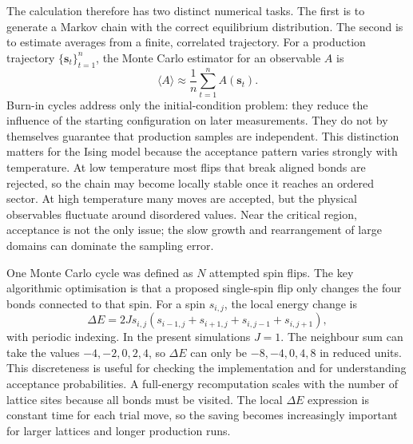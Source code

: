 \documentclass[twoside,twocolumn,9pt]{extarticle}
\begin{document}
The calculation therefore has two distinct numerical tasks. The first is to generate a Markov chain with the correct equilibrium distribution. The second is to estimate averages from a finite, correlated trajectory. For a production trajectory \(\{\mathbf{s}_t\}_{t=1}^{n}\), the Monte Carlo estimator for an observable \(A\) is
\begin{equation}
  \langle A\rangle \approx \frac{1}{n}\sum_{t=1}^{n} A(\mathbf{s}_t).
  \label{eq:mc_estimator}
\end{equation}
Burn-in cycles address only the initial-condition problem: they reduce the influence of the starting configuration on later measurements. They do not by themselves guarantee that production samples are independent. This distinction matters for the Ising model because the acceptance pattern varies strongly with temperature. At low temperature most flips that break aligned bonds are rejected, so the chain may become locally stable once it reaches an ordered sector. At high temperature many moves are accepted, but the physical observables fluctuate around disordered values. Near the critical region, acceptance is not the only issue; the slow growth and rearrangement of large domains can dominate the sampling error.

One Monte Carlo cycle was defined as \(N\) attempted spin flips. The key algorithmic optimisation is that a proposed single-spin flip only changes the four bonds connected to that spin. For a spin \(s_{i,j}\), the local energy change is
\begin{equation}
  \Delta E = 2J s_{i,j}\left(s_{i-1,j}+s_{i+1,j}+s_{i,j-1}+s_{i,j+1}\right),
  \label{eq:deltae}
\end{equation}
with periodic indexing. In the present simulations \(J=1\). The neighbour sum can take the values \(-4,-2,0,2,4\), so \(\Delta E\) can only be \(-8,-4,0,4,8\) in reduced units. This discreteness is useful for checking the implementation and for understanding acceptance probabilities. A full-energy recomputation scales with the number of lattice sites because all bonds must be visited. The local \(\Delta E\) expression is constant time for each trial move, so the saving becomes increasingly important for larger lattices and longer production runs.
\end{document}

